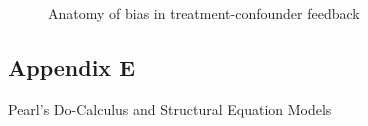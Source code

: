 \documentclass[
  single column]{article}
\begin{document}
\begin{figure}

\centering{

\feedbackB

}

\caption{\label{fig-timevarying-nofeedback}Anatomy of bias in
treatment-confounder feedback}

\end{figure}%

\newpage{}

\subsection{Appendix E}\label{appendix-e}

Pearl's Do-Calculus and Structural Equation Models

\newpage{}
\end{document}
